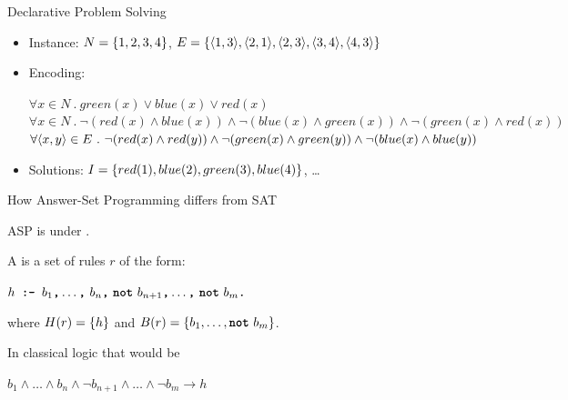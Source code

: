 \documentclass[trans,draft]{beamer} %
\begin{document}
\begin{frame}{Declarative Problem Solving}
\begin{example}
\begin{itemize}
			
				
			\onslide<+->
			
			\item Instance:
				{\scriptsize$N = \left\{{1,2,3,4}\right\}$, $E = \left\{{\langle {1,3} \rangle, \langle {2,1} \rangle, \langle {2,3} \rangle, \langle {3,4} \rangle, \langle {4,3} \rangle}\right\}$}
			
			\onslide<+->
			
			\item Encoding:
				
				{\scriptsize
				$\forall x \in N\ .\ green(x) \vee blue(x) \vee red(x)$\\
				$\forall x \in N\ .\ \neg(red(x) \wedge blue(x)) \wedge \neg(blue(x) \wedge green(x)) \wedge  \neg(green(x) \wedge red(x))$\\
				$\forall \langle {x,y} \rangle \in E\ .\ \neg (red(x) \wedge red(y)) \wedge \neg (green(x) \wedge green(y)) \wedge \neg (blue(x) \wedge blue(y))$\\
				}
			
			\onslide<+->
			
			\item Solutions: {\scriptsize$I = \left\{{red(1), blue(2), green(3), blue(4)}\right\}$}, \ldots
			
		\end{itemize}
		
	\end{example}
	
	
\end{frame}

\begin{frame}{How Answer-Set Programming differs from SAT}
	\onslide<+->
	
	ASP is  under .
	
	\onslide<+->
	
	\begin{definition}
		A  is a set of rules $r$ of the form:
		\begin{center}
			$h \code{ :- } b_1 \code{,} \ldots \code{,}\ b_n \code{,}\ \code{not}\ b_{n+1} \code{,} \ldots \code{,}\ \code{not}\ b_m \code{.}$
		\end{center}
		where $H\mathrm{(}{r}\mathrm{)} = \left\{{h}\right\}$ and $\body{r} = \set{b_1, \ldots, \code{not}\ b_m}$.
	\end{definition}
	
	In classical logic that would be
	\begin{center}
		$b_1 \wedge \ldots \wedge b_n \wedge \neg b_{n+1} \wedge \ldots \wedge \neg b_m \rightarrow h$
	\end{center}
	
\end{frame}
\end{document}
